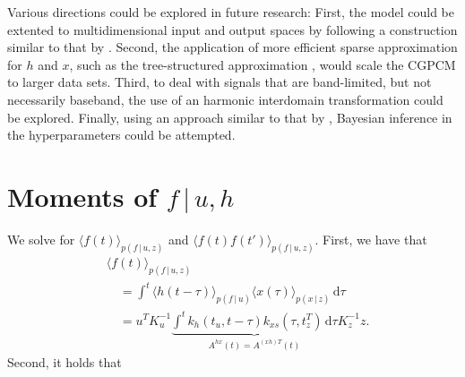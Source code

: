 \documentclass{article}
\newcommand{\id}[1]{\, \mathrm{d} #1}     %
\newcommand{\cond}{\, | \,}               %
\newcommand{\la}{\langle}
\newcommand{\ra}{\rangle}
\begin{document}
Various directions could be explored in future research: First, the model could be extented to multidimensional input and output spaces by following a construction similar to that by \citet{Bruinsma:2016:GGPCM}. Second, the application of more efficient sparse approximation for $h$ and $x$, such as the tree-structured approximation \cite{Bui:2014:Tree-Structured_Gaussian}, would scale the CGPCM to larger data sets. Third, to deal with signals that are band-limited, but not necessarily baseband, the use of an harmonic interdomain transformation \cite{Tobar:2015:Inter-Domain_Inducing} could be explored.
Finally, using an approach similar to that by \citet{Lazaro-Gredilla:2013:Variational_Inference_for_Mahalanobis_Distance}, Bayesian inference in the hyperparameters could be attempted.

\appendix
\section{Moments of $f\cond u, h$}
\label{app:moments_f}
We solve for $\la f(t) \ra_{p(f\cond u,z)}$ and $\la f(t) f(t') \ra_{p(f\cond u,z)}$. First, we have that
\begin{align*}
    &\la f(t) \ra_{p(f\cond u,z)} \\
    &\quad= \int^t \la h(t - \tau)\ra_{p(f\cond u)} \la x(\tau) \ra_{p(x\cond z)} \id{\tau} \\
    &\quad= u^T K_u^{-1} \underbrace{\int^t k_h(t_u,t-\tau) k_{xs}(\tau, t_z^T) \id{ \tau}}_{A^{hx}(t)=A^{(xh)T}(t)} K_z^{-1} z.
\end{align*}
Second, it holds that
\end{document}
